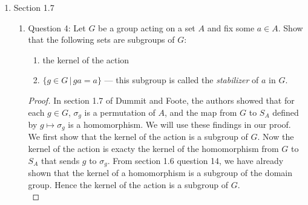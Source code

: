 \documentclass{article}
\begin{document}
\begin{enumerate}
\begin{enumerate}
\begin{proof}
          To find $\ker(\pi_1)$, we wish to find $(a,b)\in A\times B$ such
          that $pi_1((a,b))=a=1_A$. Clearly, we get
          $\ker(\pi_1)=\{1_A\}\times B$. Similarly for $\pi_2$, we get
          $\ker(\pi_2)=A\times\{1_B\}$.
        \end{proof}
    \end{enumerate}

  \item Section 1.7
    \begin{enumerate}
      \item Question 4: Let $G$ be a group acting on a set $A$ and fix some
        $a\in A$. Show that the following sets are subgroups of $G$:
        \begin{enumerate}
          \item the kernel of the action
          \item $\{g\in G\,|\,ga=a\}$ --- this subgroup is called the
            \textit{stabilizer} of $a$ in $G$.
        \end{enumerate}

        \begin{proof}
          In section 1.7 of Dummit and Foote, the authors showed that for
          each $g\in G$, $\sigma_g$ is a permutation of $A$, and the map
          from $G$ to $S_A$ defined by $g\mapsto\sigma_g$ is a
          homomorphism. We will use these findings in our proof. \\

          We first show that the kernel of the action is a subgroup of
          $G$. Now the kernel of the action is exacty the kernel of the
          homomorphism from $G$ to $S_A$ that sends $g$ to $\sigma_g$. From
          section 1.6 question 14, we have already shown that the kernel of
          a homomorphism is a subgroup of the domain group. Hence the
          kernel of the action is a subgroup of $G$. \\


\end{proof}
\end{enumerate}
\end{enumerate}
\end{document}
